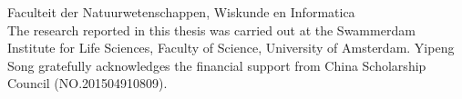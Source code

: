 {\vfill

\noindent
Faculteit der Natuurwetenschappen, Wiskunde en Informatica\\[2ex] %

\noindent
The research reported in this thesis was carried out at the Swammerdam Institute
for Life Sciences, Faculty of Science, University of Amsterdam. Yipeng Song gratefully acknowledges the financial support from China Scholarship Council (NO.201504910809).
\vskip 2cm
}

